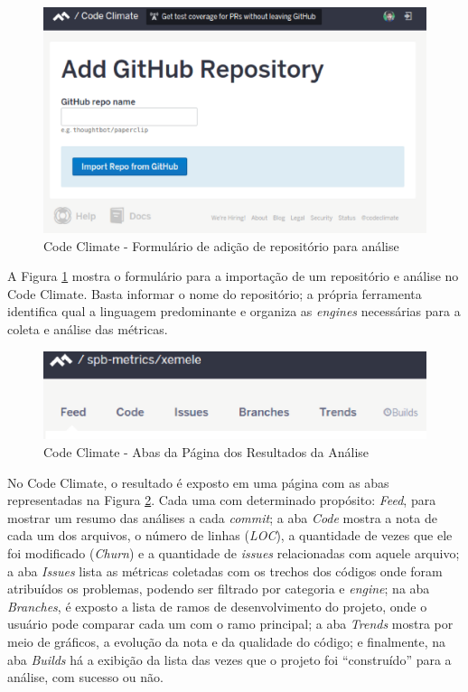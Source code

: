 \begin{figure}[h]
  \centering
    \includegraphics[keepaspectratio=true,scale=0.48]
    {figuras/form_codeClimate.eps}
  \caption{Code Climate - Formulário de adição de repositório para análise}
  \label{fig:form_codeClimate}
\end{figure}

\newpage

A Figura \ref{fig:form_codeClimate} mostra o formulário para a importação de um
repositório e análise no Code Climate. Basta informar o nome do repositório; a
própria ferramenta identifica qual a linguagem predominante e organiza as
\textit{engines} necessárias para a coleta e análise das métricas.

\begin{figure}[!htb]
	\centering
    \includegraphics[keepaspectratio=true,scale=0.5]
    {figuras/codeclimate_abas.eps}
  \caption{Code Climate - Abas da Página dos Resultados da Análise}
	\label{fig:codeclimate_abas}
\end{figure}

No Code Climate, o resultado é exposto em uma página com as abas representadas
na Figura \ref{fig:codeclimate_abas}. Cada uma com determinado propósito:
\textit{Feed}, para mostrar um resumo das análises a cada \textit{commit}; a aba
\textit{Code} mostra a nota de cada um dos arquivos, o número de linhas (\textit{LOC}),
a quantidade de vezes que ele foi modificado (\textit{Churn}) e a quantidade de
\textit{issues} relacionadas com aquele arquivo; a aba \textit{Issues} lista as
métricas coletadas com os trechos dos códigos onde foram atribuídos os problemas,
podendo ser filtrado por categoria e \textit{engine}; na aba \textit{Branches},
é exposto a lista de ramos de desenvolvimento do projeto, onde o usuário pode
comparar cada um com o ramo principal; a aba \textit{Trends} mostra por meio de
gráficos, a evolução da nota e da qualidade do código; e finalmente, na aba
\textit{Builds} há a exibição da lista das vezes que o projeto foi ``construído''
para a análise, com sucesso ou não.

